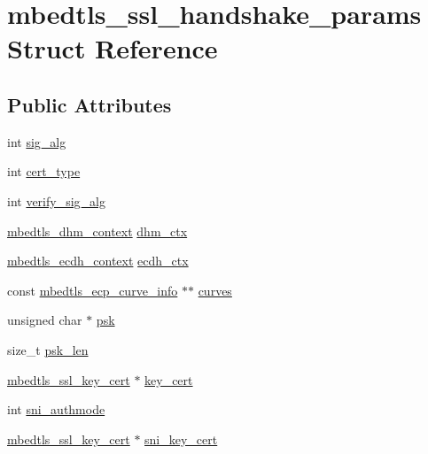 \hypertarget{structmbedtls__ssl__handshake__params}{\section{mbedtls\-\_\-ssl\-\_\-handshake\-\_\-params Struct Reference}
\label{structmbedtls__ssl__handshake__params}
}
\subsection*{Public Attributes}
\begin{DoxyCompactItemize}
\item 
int \hyperlink{structmbedtls__ssl__handshake__params_a5bd51cd234637157e288f1e5779701c5}{sig\-\_\-alg}
\item 
int \hyperlink{structmbedtls__ssl__handshake__params_a7915b5d4d8c7a61b2fa2a8eb6d8d8368}{cert\-\_\-type}
\item 
int \hyperlink{structmbedtls__ssl__handshake__params_ab950ce283cc477ea1a246689ecd2a22d}{verify\-\_\-sig\-\_\-alg}
\item 
\hyperlink{structmbedtls__dhm__context}{mbedtls\-\_\-dhm\-\_\-context} \hyperlink{structmbedtls__ssl__handshake__params_aaa85609e03e300c910db01e8a321950f}{dhm\-\_\-ctx}
\item 
\hyperlink{structmbedtls__ecdh__context}{mbedtls\-\_\-ecdh\-\_\-context} \hyperlink{structmbedtls__ssl__handshake__params_ac817564988b758dfa0d6829f78817712}{ecdh\-\_\-ctx}
\item 
const \hyperlink{structmbedtls__ecp__curve__info}{mbedtls\-\_\-ecp\-\_\-curve\-\_\-info} $\ast$$\ast$ \hyperlink{structmbedtls__ssl__handshake__params_a521abec631fe5c81cf5c094cc374b8eb}{curves}
\item 
unsigned char $\ast$ \hyperlink{structmbedtls__ssl__handshake__params_a249e9ec2254eef073c3ead5544139415}{psk}
\item 
size\-\_\-t \hyperlink{structmbedtls__ssl__handshake__params_ac91fb6cfeeda006fa2b9a1749186d216}{psk\-\_\-len}
\item 
\hyperlink{structmbedtls__ssl__key__cert}{mbedtls\-\_\-ssl\-\_\-key\-\_\-cert} $\ast$ \hyperlink{structmbedtls__ssl__handshake__params_a149899c222855d2cc33aa4cc326b09cd}{key\-\_\-cert}
\item 
int \hyperlink{structmbedtls__ssl__handshake__params_ada4c8d021bb297b6728d6f117a026fd0}{sni\-\_\-authmode}
\item 
\hyperlink{structmbedtls__ssl__key__cert}{mbedtls\-\_\-ssl\-\_\-key\-\_\-cert} $\ast$ \hyperlink{structmbedtls__ssl__handshake__params_abe0893bc6a388d5e2f584cd4025a76b4}{sni\-\_\-key\-\_\-cert}
$$
\end{DoxyCompactItemize}
